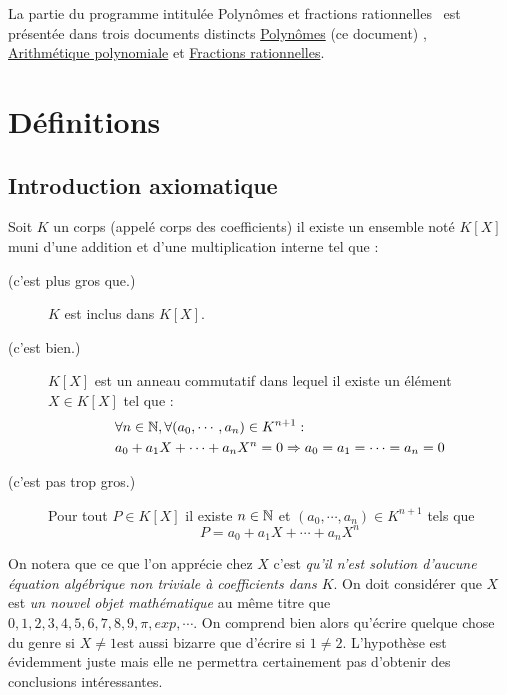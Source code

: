 


La partie du programme intitulée \og Polynômes et fractions rationnelles\fg~ est présentée dans trois documents distincts \href{\baseurl C1622.pdf}{Polynômes} (ce document) , \href{\baseurl C2160.pdf}{Arithmétique polynomiale} et \href{\baseurl C1623.pdf}{Fractions rationnelles}.

\section{Définitions}
\subsection{Introduction axiomatique}
\begin{frame}
  \begin{pa}
   Soit $K$ un corps (appelé corps des coefficients)  il existe un ensemble noté $K[X]$ muni d'une addition et d'une multiplication interne tel que :
\begin{description}
 \item[\small{(c'est plus gros que.)}] $K$ est inclus dans $K[X]$.
 \item[\small{(c'est bien.)}]$K[X]$ est un anneau commutatif dans lequel il existe un élément $X\in K[X]$ tel que :
\begin{align*}
 &\forall n \in \mathbb{N} , \forall (a_0,\cdots,a_n)\in K^{n+1} :\\
&a_0+a_1X + \cdots + a_nX^n=0 \Rightarrow a_0=a_1=\cdots=a_n=0
\end{align*}
\item[\small{(c'est pas trop gros.)}]Pour tout $P\in K[X]$ il existe $n\in \mathbb{N}$ et $(a_0,\cdots,a_n)\in K^{n+1}$ tels que
\begin{displaymath}
 P = a_0+a_1X + \cdots + a_nX^n
\end{displaymath}
 \end{description}
  \end{pa}
 \end{frame}

On notera que ce que l'on apprécie chez $X$ c'est \emph{qu'il n'est solution d'aucune équation algébrique non triviale à coefficients dans $K$}. On doit considérer que $X$ est \emph{un nouvel objet mathématique} au même titre que $0,1,2,3,4,5,6,7,8,9,\pi,exp,\cdots$. On comprend bien alors qu'écrire quelque chose du genre \og si $X\neq1$\fg est aussi bizarre que d'écrire \og si $1\neq2$\fg. L'hypothèse est évidemment juste mais elle ne permettra certainement pas d'obtenir des conclusions intéressantes.

